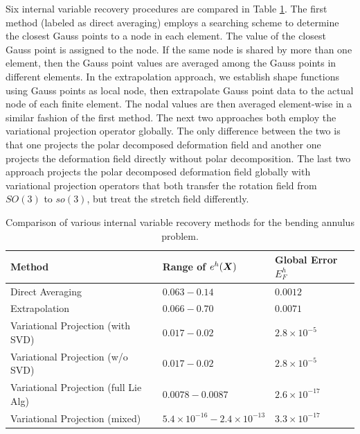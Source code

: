 \documentclass[12pt]{article}
\begin{document}
Six internal variable recovery procedures are compared in  Table 
\ref{tab:RingErrorComparison}. The first method (labeled as direct averaging) 
employs a searching scheme to determine the closest Gauss points to a node 
in each element. The value of the closest Gauss point is assigned
to the node. If the same node is shared by more than one element, then the 
Gauss point values are averaged among the Gauss points in different elements. 
In the  extrapolation approach, we establish shape functions using Gauss points 
as local node, then extrapolate Gauss point data to the actual node of each finite 
element. The nodal values are then averaged element-wise in a similar fashion of 
the first method. The next two approaches both employ the variational projection
operator globally. The only difference between the two is that one projects the polar 
decomposed deformation field and another one projects the deformation field directly 
without polar decomposition. The last two approach projects the polar decomposed 
deformation field globally with variational projection operators that both transfer the 
rotation field from $SO(3)$ to $so(3)$, but treat the stretch field differently.  
 
\begin{table}[htbp]
  \begin{center}
    \begin{tabular}{ l l l }
      \toprule
      
      Method
      &
      Range of $e^{h}({\boldsymbol{X}})$
      & 
      Global Error $E_{F}^{h}$
      \\
      \hline
      Direct Averaging
      &
      $0.063-0.14$
      & 
      $0.0012$
      \\
      Extrapolation   
      &
      $0.066-0.70$
      &
      $0.0071$
      \\
      Variational Projection (with SVD)  
      &
      $0.017-0.02$
      & 
      $2.8 \times 10^{-5}$
      \\
       Variational Projection (w/o SVD)  
      &
      $0.017-0.02$
      & 
      $2.8 \times 10^{-5}$
      \\
       Variational Projection (full Lie Alg)  
      &
      $0.0078-0.0087$
      & 
      $2.6 \times 10^{-17}$
      \\
      Variational Projection (mixed)  
      &
      $5.4 \times 10^{-16} - 2.4 \times 10^{-13}$
      & 
      $3.3 \times 10^{-17}$
      \\
      \bottomrule
    \end{tabular}
    \caption{Comparison of various internal variable recovery methods 
                  for the bending annulus problem.}
    \label{tab:RingErrorComparison}
  \end{center}
\end{table}
\end{document}

